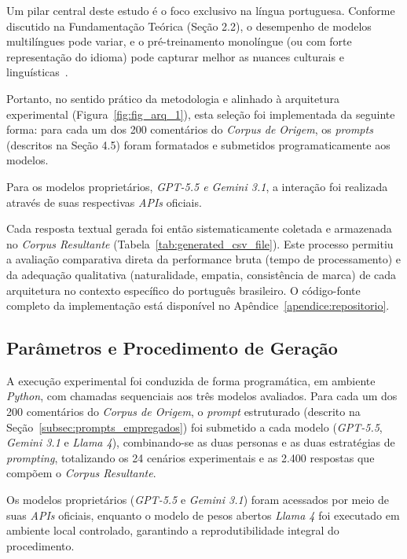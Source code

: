 \documentclass[12pt, a4paper]{article}
\numberwithin{equation}{section}
\begin{document}
Um pilar central deste estudo é o foco exclusivo na língua portuguesa. Conforme discutido na Fundamentação Teórica (Seção 2.2), o desempenho de modelos multilíngues pode variar, e o pré-treinamento monolíngue (ou com forte representação do idioma) pode capturar melhor as nuances culturais e linguísticas~\cite{araujo2024Explorando}.

Portanto, no sentido prático da metodologia e alinhado à arquitetura experimental (Figura~\ref{fig:fig_arq_1}), esta seleção foi implementada da seguinte forma: para cada um dos 200 comentários do \textit{Corpus de Origem}, os \textit{prompts} (descritos na Seção 4.5) foram formatados e submetidos programaticamente aos modelos.

Para os modelos proprietários, \textit{GPT-5.5 e Gemini 3.1}, a interação foi realizada através de suas respectivas \textit{APIs} oficiais.

Cada resposta textual gerada foi então sistematicamente coletada e armazenada no \textit{Corpus Resultante} (Tabela~\ref{tab:generated_csv_file}). Este processo permitiu a avaliação comparativa direta da performance bruta (tempo de processamento) e da adequação qualitativa (naturalidade, empatia, consistência de marca) de cada arquitetura no contexto específico do português brasileiro. O código-fonte completo da implementação está disponível no Apêndice~\ref{apendice:repositorio}.

 \subsection{Parâmetros e Procedimento de Geração}
 
 A execução experimental foi conduzida de forma programática, em ambiente \textit{Python}, com chamadas sequenciais aos três modelos avaliados. Para cada um dos 200 comentários do \textit{Corpus de Origem}, o \textit{prompt} estruturado (descrito na 
Seção~\ref{subsec:prompts_empregados}) foi submetido a cada modelo (\textit{GPT-5.5}, 
\textit{Gemini 3.1} e \textit{Llama 4}), combinando-se as duas personas e as duas estratégias de \textit{prompting}, totalizando os 24 cenários experimentais e as 2.400 respostas que compõem o \textit{Corpus Resultante}.
 
Os modelos proprietários (\textit{GPT-5.5} e \textit{Gemini 3.1}) foram acessados por meio de suas \textit{APIs} oficiais, enquanto o modelo de pesos abertos \textit{Llama 4} foi executado em ambiente local controlado, garantindo a reprodutibilidade integral do procedimento.
\end{document}
